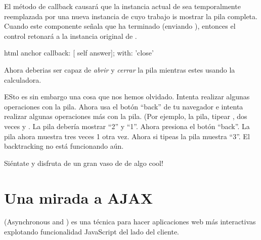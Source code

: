 \documentclass[a4paper,10pt,twoside]{book}
\begin{document}
El m\'etodo de callback causar\'a que la instancia actual de  sea temporalmente reemplazada por una nueva instancia de  
cuyo trabajo is mostrar la pila completa.
Cuando este componente se\~nala que ha terminado (\ie enviando ), entonces el control retonar\'a a la instancia original de .


\begin{code}{}
html anchor
	callback: [ self answer];
	with: 'close'
\end{code}

Ahora deberias ser capaz de \emph{abrir} y \emph{cerrar} la pila mientras estes usando la calculadora.

ESto es sin embargo una cosa que nos hemos olvidado.
Intenta realizar algunas operaciones con la pila.
Ahora usa el bot\'on ``back'' de tu navegador e intenta realizar algunas operaciones m\'as con la pila.
(Por ejemplo,  la pila, tipear ,  dos veces y \menu {+}.
La pila deber\'ia mostrar ``2'' y ``1''.
Ahora presiona el bot\'on ``back''.
La pila ahora muestra tres veces 1 otra vez.
Ahora si tipeas \menu{+} la pila muestra ``3''.
El backtracking no est\'a funcionando a\'un.


Si\'entate y disfruta de un gran vaso de de algo cool!

\section{Una mirada a AJAX}

 (Asynchronous  and ) es una t\'ecnica para hacer aplicaciones web m\'as interactivas explotando funcionalidad JavaScript del lado del cliente.
\end{document}
